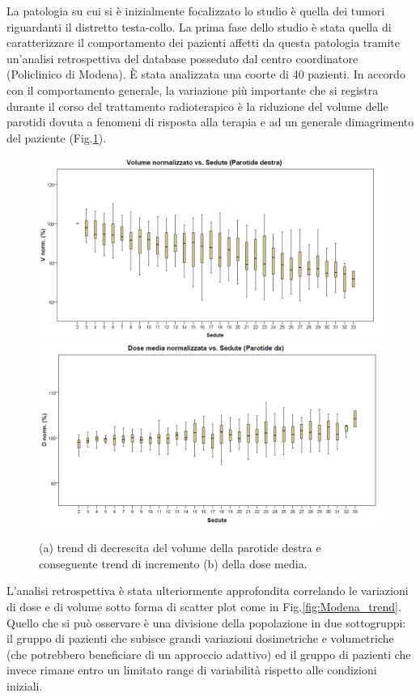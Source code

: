 La patologia su cui si è inizialmente focalizzato lo studio è quella dei tumori riguardanti il distretto testa-collo. La prima fase dello studio è stata quella di caratterizzare il comportamento dei pazienti affetti da questa patologia tramite un'analisi retrospettiva del database posseduto dal centro coordinatore (Policlinico di Modena). \`E stata analizzata una coorte di 40 pazienti. In accordo con il comportamento generale, la variazione più importante che si registra durante il corso del trattamento radioterapico è la riduzione del volume delle parotidi dovuta a fenomeni di risposta alla terapia e ad un generale dimagrimento del paziente (Fig.\ref{fig:Modena_DV}).
\begin{figure}
\includegraphics[width=.8\textwidth]{./cap3/Modena_volDecrease.png}\\
\includegraphics[width=.8\textwidth]{./cap3/Modena_dosIncrease.png}
\caption{(a) trend di decrescita del volume della parotide destra e conseguente trend di incremento (b) della dose media.}
\label{fig:Modena_DV}
\end{figure}

L'analisi retrospettiva è stata ulteriormente approfondita correlando le variazioni di dose e di volume sotto forma di scatter plot come in Fig.\ref{fig:Modena_trend}. Quello che si può osservare è una divisione della popolazione in due sottogruppi: il gruppo di pazienti che subisce grandi variazioni dosimetriche e volumetriche (che potrebbero beneficiare di un approccio adattivo) ed il gruppo di pazienti che invece rimane entro un limitato range di variabilità rispetto alle condizioni iniziali.

